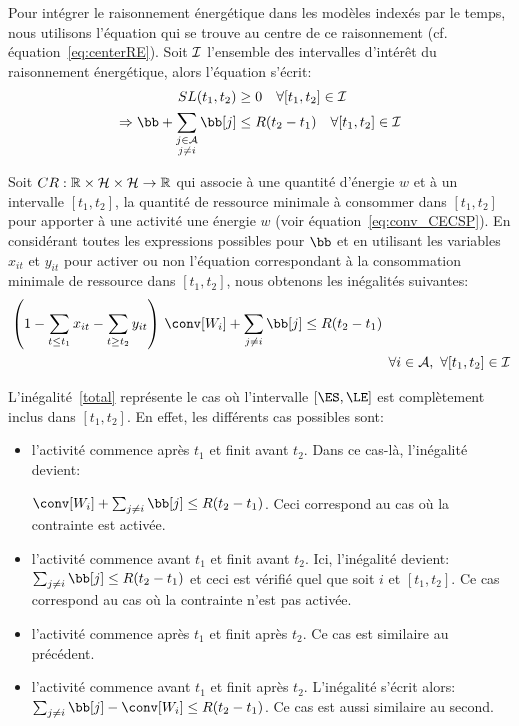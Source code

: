 Pour intégrer le raisonnement énergétique dans les modèles indexés par
le temps, nous utilisons l'équation qui se trouve au centre de ce
raisonnement (cf. équation~\eqref{eq:centerRE}). Soit ${\cal I}$ l'ensemble des
intervalles d'intérêt du raisonnement énergétique, alors l'équation
s'écrit:  
\begin{align} 
  SL(t_1,t_2) &\ge 0 \quad \forall [t_1,t_2] \in \I \nonumber\\
  \Rightarrow \bb + \sum_{\substack{j\in \A\\j\neq i}}\bb[j] &\le
  R(t_2-t_1)\quad \forall [t_1,t_2] \in \I \nonumber
\end{align}  

Soit $CR: \mathbb{R} \times {\cal H} \times {\cal H} \rightarrow \mathbb{R}$ qui
associe à une quantité d'énergie $w$ et à un intervalle $[t_1,t_2]$,
la quantité de ressource minimale à consommer dans $[t_1,t_2]$ pour
apporter à une activité une énergie $w$ (voir
équation~\eqref{eq:conv_CECSP}). En considérant toutes les
expressions possibles pour $\bb$ et en utilisant les variables
$x_{it}$ et $y_{it}$ pour activer ou non l'équation correspondant à la
consommation minimale de ressource dans $[t_1,t_2]$, nous obtenons les
inégalités suivantes: 
\begin{align}
  &\left(1-\sum_{t\le t_1}x_{it} - \sum_{t\ge t_2}y_{it}\right) \, \conv[W_i] +
    \sum_{j\neq i} \bb[j] \le R(t_2-t_1) \nonumber\\
  & \hspace{9.55cm} \forall i \in \A,\ \forall [t_1,t_2] \in \I
    \label{total}
\end{align}

L'inégalité~\eqref{total} représente le cas où l'intervalle
$[\ES,\LE]$ est complètement inclus dans $[t_1,t_2]$. En effet,
les différents cas possibles sont: 
\begin{itemize}
\item l'activité commence après $t_1$ et finit avant $t_2$. Dans ce
  cas-là, l'inégalité devient: 

$\conv[W_i] +\sum_{j\neq i} \bb[j] \le
  R(t_2-t_1)$. Ceci correspond au cas où la contrainte est activée. 
\item l'activité commence avant $t_1$ et finit avant $t_2$. Ici,
  l'inégalité devient: $\sum_{j\neq i} \bb[j] \le R(t_2-t_1)$ et ceci
  est vérifié quel que soit $i$ et $[t_1,t_2]$. Ce cas correspond au
  cas où la contrainte n'est pas activée. 
\item l'activité commence après $t_1$ et finit après $t_2$. Ce cas est
  similaire au précédent. 
\item l'activité commence avant $t_1$ et finit après
  $t_2$. L'inégalité s'écrit alors: $\sum_{j\neq i} \bb[j]-\conv[W_i]
  \le R(t_2-t_1)$. Ce cas est aussi similaire au second. 
\end{itemize}

